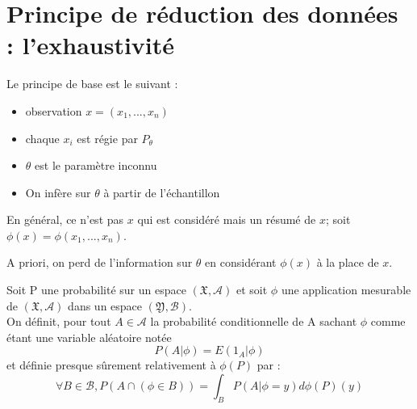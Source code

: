 
\section{Principe de réduction des données : l'exhaustivité}
Le principe de base est le suivant : \begin{itemize}
	\item observation $x=(x_1,...,x_n)$
	\item chaque $x_i$ est régie par $P_{\theta}$
	\item $\theta$ est le paramètre inconnu
	\item On infère sur $\theta$ à partir de l'échantillon
\end{itemize}

En général, ce n'est pas $x$ qui est considéré mais un résumé de $x$; soit $\phi(x)=\phi(x_1,...,x_n)$. 

\bigskip
A priori, on perd de l'information sur $\theta$ en considérant $\phi(x)$ à la place de $x$.

\begin{rap}
	Soit P une probabilité sur un espace $(\mathfrak{X},\mathcal{A})$ et soit $\phi$ une application mesurable de $(\mathfrak{X},\mathcal{A})$ dans un espace $(\mathfrak{Y},\mathcal{B})$.\\
	On définit, pour tout $A\in\mathcal{A}$ la probabilité conditionnelle de A sachant $\phi$ comme étant une variable aléatoire notée
	\[P(A|\phi)=E(1_A |\phi)\]
	et définie presque sûrement relativement à $\phi(P)$ par :
	\[\forall B\in\mathcal{B}, P(A\cap(\phi\in B))=\int_B P(A|\phi=y) d\phi(P)(y)\]
\end{rap}


